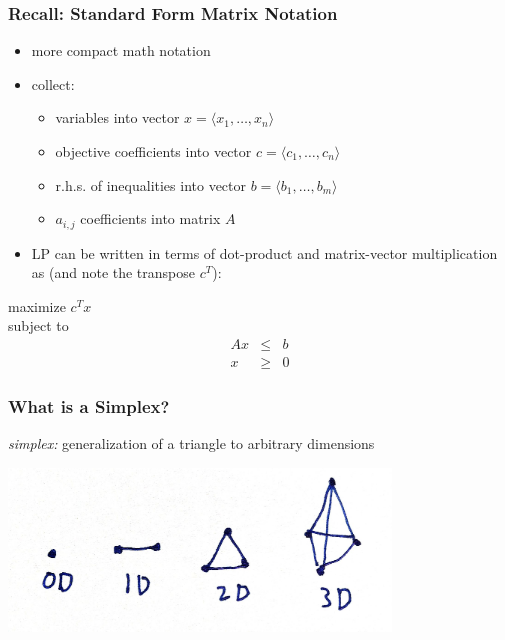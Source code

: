 \documentclass{beamer}
\begin{document}
\begin{frame} \frametitle{Recall: Standard Form Matrix Notation}
\begin{itemize}
  \item more compact math notation
  \item collect:
  \begin{itemize}
    \item variables into vector $x=\langle x_1, \ldots, x_n \rangle$
    \item objective coefficients into vector $c=\langle c_1, \ldots, c_n\rangle$
    \item r.h.s. of inequalities into vector $b=\langle b_1, \ldots, b_m\rangle$
    \item $a_{i,j}$ coefficients into matrix $A$
  \end{itemize}
  \item LP can be written in terms of dot-product and matrix-vector multiplication
    as (and note the transpose $c^T$):
\end{itemize}
\vspace{.5cm}
maximize $c^T x$ \\
subject to
\begin{eqnarray*}
  Ax &\leq& b \\
  x &\geq& 0
\end{eqnarray*}
\end{frame}

\begin{frame} \frametitle{What is a Simplex?}
  \emph{simplex:} generalization of a triangle to arbitrary dimensions

  \begin{center}
  \includegraphics[width=4in]{simplices.jpg}
\end{center}
\end{frame}
\end{document}
